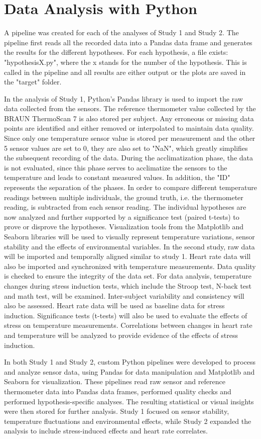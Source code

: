 \section{Data Analysis with Python}
A pipeline was created for each of the analyses of Study 1 and Study 2. 
The pipeline first reads all the recorded data into a Pandas data frame and generates the results for the different hypotheses.
For each hypothesis, a file exists: "hypothesisX.py", where the x stands for the number of the hypothesis. 
This is called in the pipeline and all results are either output or the plots are saved in the "target" folder.

In the analysis of Study 1, Python's Pandas library is used to import the raw data collected from the sensors. 
The reference thermometer value collected by the BRAUN ThermoScan 7 is also stored per subject. 
Any erroneous or missing data points are identified and either removed or interpolated to maintain data quality. 
Since only one temperature sensor value is stored per measurement and the other 5 sensor values are set to 0, they are also set to "NaN", which greatly simplifies the subsequent recording of the data.
During the acclimatization phase, the data is not evaluated, since this phase serves to acclimatize the sensors to the temperature and leads to constant measured values.
In addition, the "ID" represents the separation of the phases.
In order to compare different temperature readings between multiple individuals, the ground truth, i.e. the thermometer reading, is subtracted from each sensor reading.
The individual hypotheses are now analyzed and further supported by a significance test (paired t-tests) to prove or disprove the hypotheses.
Visualization tools from the Matplotlib and Seaborn libraries will be used to visually represent temperature variations, sensor stability and the effects of environmental variables.
In the second study, raw data will be imported and temporally aligned similar to study 1. Heart rate data will also be imported and synchronized with temperature measurements. 
Data quality is checked to ensure the integrity of the data set.
For data analysis, temperature changes during stress induction tests, which include the Stroop test, N-back test and math test, will be examined. 
Inter-subject variability and consistency will also be assessed. 
Heart rate data will be used as baseline data for stress induction. 
Significance tests (t-tests) will also be used to evaluate the effects of stress on temperature measurements. 
Correlations between changes in heart rate and temperature will be analyzed to provide evidence of the effects of stress induction. 

In both Study 1 and Study 2, custom Python pipelines were developed to process and analyze sensor data, using Pandas for data manipulation and Matplotlib and Seaborn for visualization. These pipelines read raw sensor and reference thermometer data into Pandas data frames, performed quality checks and performed hypothesis-specific analyses. The resulting statistical or visual insights were then stored for further analysis. Study 1 focused on sensor stability, temperature fluctuations and environmental effects, while Study 2 expanded the analysis to include stress-induced effects and heart rate correlates.